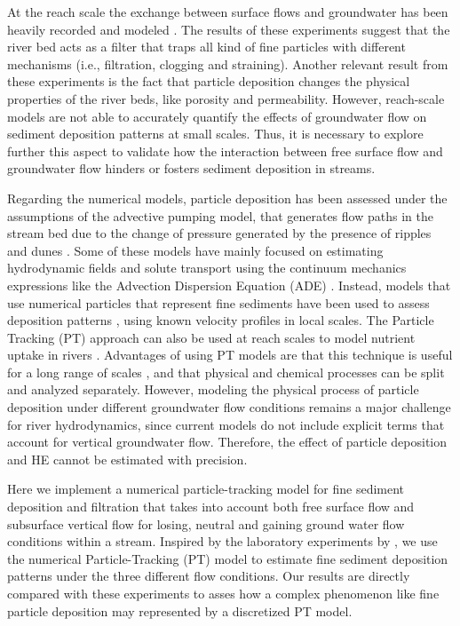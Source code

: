 \documentclass[draft,linenumbers]{agujournal2018}
\begin{document}
At the reach scale the exchange between surface flows and groundwater has been heavily recorded and modeled  \citep{Woessner2000a,Cardenas2004,Harvey2012}. The results of these experiments suggest that the river bed acts as a filter that traps all kind of fine particles with different mechanisms (i.e., filtration, clogging and straining). Another relevant result from these experiments is the fact that particle deposition changes the physical properties of the river beds, like porosity and permeability. However, reach-scale models are not able to accurately quantify the effects of groundwater flow on sediment deposition patterns at small scales. Thus, it is necessary to explore further this aspect to validate how the interaction between free surface flow and groundwater flow hinders or fosters sediment deposition in streams. 

Regarding the numerical models, particle deposition has been assessed under the assumptions of the advective pumping model, that generates flow paths in the stream bed due to the change of pressure generated by the presence of ripples and dunes \citep{Elliott1997,Elliott1997b}. Some of these models have mainly focused on estimating hydrodynamic fields and solute transport using the continuum mechanics expressions like the Advection Dispersion Equation (ADE) \citep{Cardenas2006,Cardenas2007f,Cardenas2007b,Boano2007b,BayaniCardenas2008c,Trauth2013}. Instead, models that use numerical particles that represent fine sediments have been used to assess deposition patterns \citep{Packman2000}, using known velocity profiles in local scales. The Particle Tracking (PT) approach can also be used at reach scales to model nutrient uptake in rivers \citep{Li2017}. Advantages of using PT models are that this technique is useful for a long range of scales \citep{Delay2005}, and that physical and chemical processes can be split and analyzed separately. However, modeling the physical process of particle deposition under different groundwater flow conditions remains a major challenge for river hydrodynamics, since current models do not include explicit terms that account for vertical groundwater flow. Therefore, the effect of particle deposition and HE cannot be estimated with precision. 

Here we implement a numerical particle-tracking model for fine sediment deposition and filtration that takes into account both free surface flow and subsurface vertical flow for losing, neutral and gaining ground water flow conditions within a stream. Inspired by the laboratory experiments by \citet{Fox2014,Fox2018}, we use the numerical Particle-Tracking (PT) model to estimate fine sediment deposition patterns under the three different flow conditions. Our results are directly compared with these experiments to asses how a complex phenomenon like fine particle deposition may represented by a discretized PT model. 
\end{document}
